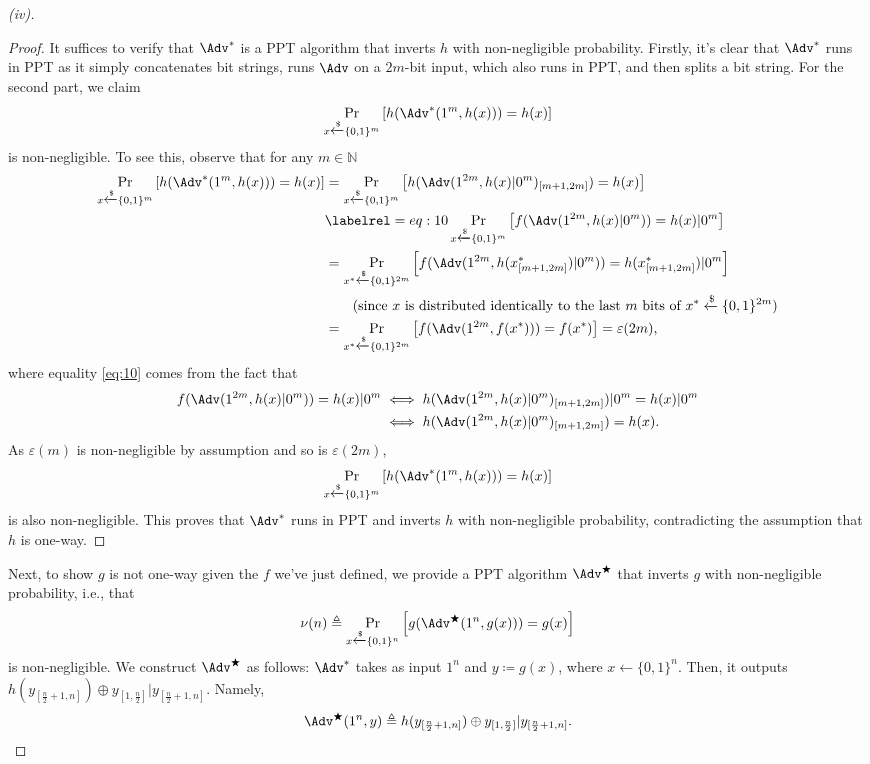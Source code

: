 \begin{proof}[(iv)]
\begin{proof}
        It suffices to verify that $\Adv^\ast$ is a PPT algorithm that inverts $h$ with non-negligible probability. Firstly, it's clear that $\Adv^\ast$ runs in PPT as it simply concatenates bit strings, runs $\Adv$ on a $2m$-bit input, which also runs in PPT, and then splits a bit string. For the second part, we claim
        \[
        \Pr_{x\xleftarrow{\$}\{0,1\}^m}\left[h(\Adv^\ast(1^m, h(x))) = h(x)\right]
        \]
        is non-negligible. To see this, observe that for any $m\in\mathbb{N}$
        \begin{align*}
            \Pr_{x\xleftarrow{\$}\{0,1\}^m}\left[h(\Adv^\ast(1^m, h(x))) = h(x)\right]
            &= \Pr_{x\xleftarrow{\$}\{0,1\}^m}\left[h(\Adv(1^{2m}, h(x)|0^m)_{[m+1,2m]}) = h(x)\right]\\
            &\labelrel={eq:10} \Pr_{x\xleftarrow{\$}\{0,1\}^m}\left[f(\Adv(1^{2m}, h(x)|0^m)) = h(x)|0^m\right]\\
            &= \Pr_{x^\ast\xleftarrow{\$}\{0,1\}^{2m}}\left[f(\Adv(1^{2m}, h(x^\ast_{[m+1, 2m]})|0^m)) = h(x^\ast_{[m+1, 2m]})|0^m\right]\\
            &\qquad (\text{since } x \text{ is distributed identically to the last } m \text{ bits of }x^\ast\xleftarrow{\$}\{0,1\}^{2m})\\
            &= \Pr_{x^\ast\xleftarrow{\$}\{0,1\}^{2m}}\left[f(\Adv(1^{2m}, f(x^\ast))) = f(x^\ast)\right]
            = \varepsilon(2m),
        \end{align*}
        where equality \eqref{eq:10} comes from the fact that
        \begin{align*}
        f(\Adv(1^{2m}, h(x)|0^m)) = h(x)|0^m
        &\iff h(\Adv(1^{2m}, h(x)|0^m)_{[m+1,2m]})|0^m = h(x)|0^m \\
        &\iff h(\Adv(1^{2m}, h(x)|0^m)_{[m+1,2m]}) = h(x).
        \end{align*}
        As $\varepsilon(m)$ is non-negligible by assumption and so is $\varepsilon(2m)$,
        \[
        \Pr_{x\xleftarrow{\$}\{0,1\}^m}\left[h(\Adv^\ast(1^m, h(x))) = h(x)\right]
        \]
        is also non-negligible. This proves that $\Adv^\ast$ runs in PPT and inverts $h$ with non-negligible probability, contradicting the assumption that $h$ is one-way.
    \end{proof}

    Next, to show $g$ is not one-way given the $f$ we've just defined, we provide a PPT algorithm $\Adv^\bigstar$ that inverts $g$ with non-negligible probability, i.e., that
    \[
    \nu(n)\triangleq \Pr_{x\xleftarrow{\$}\{0,1\}^n}\left[g(\Adv^\bigstar(1^n, g(x))) = g(x)\right]
    \]
    is non-negligible. We construct $\Adv^\bigstar$ as follows: $\Adv^\ast$ takes as input $1^{n}$ and $y\coloneq g(x)$, where $x\xleftarrow{}\{0,1\}^n$. Then, it outputs $h(y_{[\frac{n}{2}+1, n]})\oplus y_{[1,\frac{n}{2}]}|y_{[\frac{n}{2}+1, n]}$. Namely,
    \[
    \Adv^\bigstar(1^{n}, y) \triangleq h(y_{[\frac{n}{2}+1, n]})\oplus y_{[1,\frac{n}{2}]}|y_{[\frac{n}{2}+1, n]}.
    \]


\end{proof}
